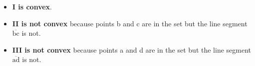 \begin{itemize}
    \item {\bf I is convex}.
    \item {\bf II is not convex} because points b and c are in the set but the line segment $\overline{\textrm{bc}}$ is not.
    \item {\bf III is not convex} because points a and d are in the set but the line segment $\overline{\textrm{ad}}$ is not.
\end{itemize}
